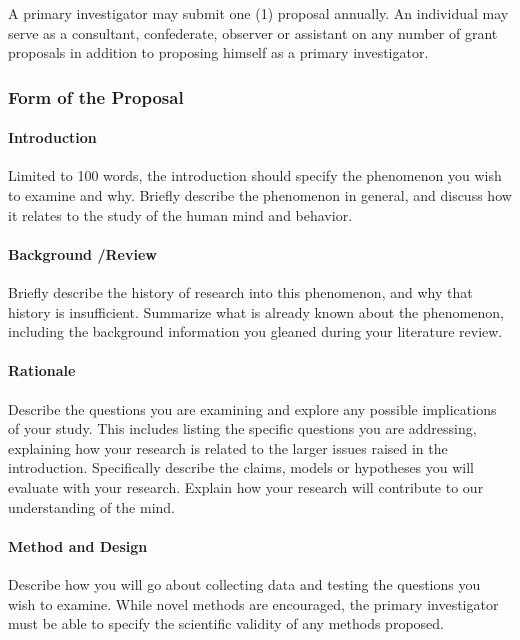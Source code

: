 A primary investigator may submit one (1) proposal annually. An individual may serve as a consultant, confederate, observer or assistant on any number of grant proposals in addition to proposing himself as a primary investigator. 

\subsubsection{Form of the Proposal}
\label{formoftheproposal}

\paragraph{Introduction}
\label{introduction}

Limited to 100 words, the introduction should specify the phenomenon you wish to examine and why. Briefly describe the phenomenon in general, and discuss how it relates to the study of the human mind and behavior.

\paragraph{Background \slash  Review}
\label{backgroundreview}

Briefly describe the history of research into this phenomenon, and why that history is insufficient. Summarize what is already known about the phenomenon, including the background information you gleaned during your literature review.

\paragraph{Rationale}
\label{rationale}

Describe the questions you are examining and explore any possible implications of your study. This includes listing the specific questions you are addressing, explaining how your research is related to the larger issues raised in the introduction. Specifically describe the claims, models or hypotheses you will evaluate with your research. Explain how your research will contribute to our understanding of the mind.

\paragraph{Method and Design}
\label{methodanddesign}

Describe how you will go about collecting data and testing the questions you wish to examine. While novel methods are encouraged, the primary investigator must be able to specify the scientific validity of any methods proposed.

